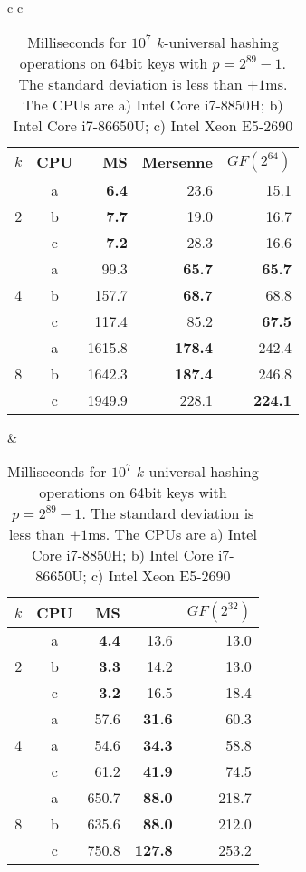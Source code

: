 \begin{table}[H]
   \centering
   \begin{tabular}{c c}
      \begin{tabular}{r c | r r r}
         $k$ & CPU &  MS & Mersenne       & $GF(2^{64})$ \\
         \hline
           & a & \textbf{6.4} & 23.6 & 15.1 \\
         2 & b & \textbf{7.7} & 19.0 & 16.7 \\
           & c & \textbf{7.2} & 28.3 & 16.6 \\
         \hline
           & a & 99.3 & \textbf{65.7} & \textbf{65.7} \\
         4 & b & 157.7 &\textbf{68.7}  & 68.8 \\
           & c & 117.4 & 85.2 & \textbf{67.5}\\
         \hline
             & a & 1615.8 & \textbf{178.4} & 242.4 \\
         8 & b &  1642.3 & \textbf{187.4} & 246.8 \\
           & c & 1949.9 & 228.1 & \textbf{224.1} \\
      \end{tabular}
      \hspace{.5em}
      &
      \hspace{.5em}
      \begin{tabular}{r c | r r r}
         $k$ & CPU & MS & \Cref{alg:Mersenne}       & $GF(2^{32})$ \\
         \hline
             & a & \textbf{4.4} & 13.6 & 13.0 \\
         2 & b & \textbf{3.3} & 14.2 & 13.0 \\
           & c & \textbf{3.2} & 16.5 & 18.4 \\
         \hline
           & a & 57.6 & \textbf{31.6} & 60.3 \\
         4 & a & 54.6 & \textbf{34.3}  & 58.8 \\
           & c & 61.2 & \textbf{41.9} & 74.5 \\
         \hline
           & a & 650.7 & \textbf{88.0} & 218.7 \\
         8 & b & 635.6 & \textbf{88.0} & 212.0 \\
           & c & 750.8 & \textbf{127.8} & 253.2 \\
      \end{tabular}
   \end{tabular}
   \caption{Milliseconds for $10^7$ $k$-universal hashing operations on 64bit keys with $p=2^{89}-1$.
      The standard deviation is less than $\pm1$ms.
      The CPUs are
         a) Intel Core i7-8850H; %
         b) Intel Core i7-86650U; %
         c) Intel Xeon E5-2690 %
   }
   \label{tab:hashing-experiments}
\end{table}

